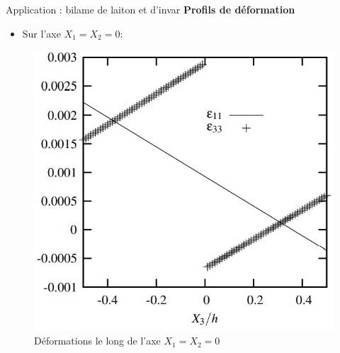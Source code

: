 \documentclass{beamer}
\begin{document}
\begin{frame}{Application : bilame de laiton et d'invar}
    \textbf{\Large{Profils de déformation}}
    
    \begin{itemize}
        \item Sur l'axe $X_1=X_2=0$:
    \end{itemize}
    \begin{figure}
        \centering
        \includegraphics[scale=0.5]{imgs/graph2.jpg}
        \caption{Déformations le long de l'axe $X_1=X_2=0$}
    \end{figure}
\end{frame}
\end{document}

